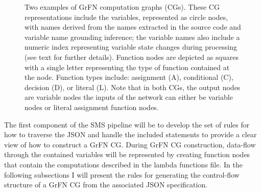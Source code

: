 \FloatBarrier
\begin{figure}[!tbp]
  \label{grfn_cgs}
  \centering
  \hfill
  \caption[GrFN Computation Graph Examples]{Two examples of GrFN computation graphs (CGs). These CG representations include the variables, represented as circle nodes, with names derived from the names extracted in the source code and variable name grounding inference; the variable names also include a numeric index representing variable state changes during processing (see text for further details). Function nodes are depicted as squares with a single letter representing the type of function contained at the node. Function types include: assignment (A), conditional (C), decision (D), or literal (L). Note that in both CGs, the output nodes are variable nodes the inputs of the network can either be variable nodes or literal assignment function nodes.}
\end{figure}
\FloatBarrier

The first component of the SMS pipeline will be to develop the set of rules for how to traverse the JSON and handle the included statements to provide a clear view of how to construct a GrFN CG.
During GrFN CG construction, data-flow through the contained variables will be represented by creating function nodes that contain the computations described in the lambda functions file.
In the following subsections I will present the rules for generating the control-flow structure of a GrFN CG from the associated JSON specification.

